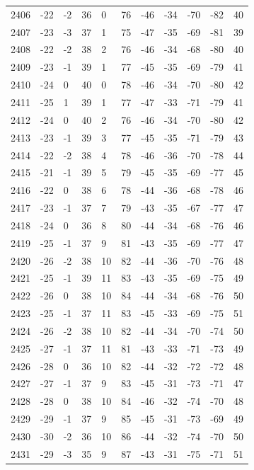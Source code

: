 \begin{table}[H]
\begin{tabular}{lllllllllll}
2406 & -22 & -2 & 36 & 0 & 76 & -46 & -34 & -70 & -82 & 40 \\
2407 & -23 & -3 & 37 & 1 & 75 & -47 & -35 & -69 & -81 & 39 \\
2408 & -22 & -2 & 38 & 2 & 76 & -46 & -34 & -68 & -80 & 40 \\
2409 & -23 & -1 & 39 & 1 & 77 & -45 & -35 & -69 & -79 & 41 \\
2410 & -24 & 0 & 40 & 0 & 78 & -46 & -34 & -70 & -80 & 42 \\
2411 & -25 & 1 & 39 & 1 & 77 & -47 & -33 & -71 & -79 & 41 \\
2412 & -24 & 0 & 40 & 2 & 76 & -46 & -34 & -70 & -80 & 42 \\
2413 & -23 & -1 & 39 & 3 & 77 & -45 & -35 & -71 & -79 & 43 \\
2414 & -22 & -2 & 38 & 4 & 78 & -46 & -36 & -70 & -78 & 44 \\
2415 & -21 & -1 & 39 & 5 & 79 & -45 & -35 & -69 & -77 & 45 \\
2416 & -22 & 0 & 38 & 6 & 78 & -44 & -36 & -68 & -78 & 46 \\
2417 & -23 & -1 & 37 & 7 & 79 & -43 & -35 & -67 & -77 & 47 \\
2418 & -24 & 0 & 36 & 8 & 80 & -44 & -34 & -68 & -76 & 46 \\
2419 & -25 & -1 & 37 & 9 & 81 & -43 & -35 & -69 & -77 & 47 \\
2420 & -26 & -2 & 38 & 10 & 82 & -44 & -36 & -70 & -76 & 48 \\
2421 & -25 & -1 & 39 & 11 & 83 & -43 & -35 & -69 & -75 & 49 \\
2422 & -26 & 0 & 38 & 10 & 84 & -44 & -34 & -68 & -76 & 50 \\
2423 & -25 & -1 & 37 & 11 & 83 & -45 & -33 & -69 & -75 & 51 \\
2424 & -26 & -2 & 38 & 10 & 82 & -44 & -34 & -70 & -74 & 50 \\
2425 & -27 & -1 & 37 & 11 & 81 & -43 & -33 & -71 & -73 & 49 \\
2426 & -28 & 0 & 36 & 10 & 82 & -44 & -32 & -72 & -72 & 48 \\
2427 & -27 & -1 & 37 & 9 & 83 & -45 & -31 & -73 & -71 & 47 \\
2428 & -28 & 0 & 38 & 10 & 84 & -46 & -32 & -74 & -70 & 48 \\
2429 & -29 & -1 & 37 & 9 & 85 & -45 & -31 & -73 & -69 & 49 \\
2430 & -30 & -2 & 36 & 10 & 86 & -44 & -32 & -74 & -70 & 50 \\
2431 & -29 & -3 & 35 & 9 & 87 & -43 & -31 & -75 & -71 & 51 \\

\end{tabular}
\end{table}
